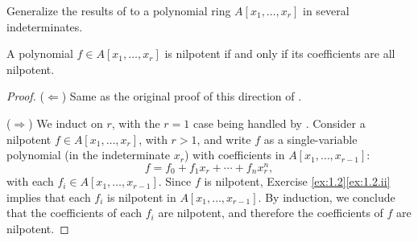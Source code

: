 \begin{exercise}
Generalize the results of  to a polynomial ring \(A[x_1,\ldots,x_r]\) in several indeterminates.
\end{exercise}

\begin{claim}
\label{claim:1.3.ii}
A polynomial \(f\in A[x_1,\ldots,x_r]\) is nilpotent if and only if its coefficients are all nilpotent.
\end{claim}

\begin{proof}
(\(\Leftarrow\))
Same as the original proof of this direction of .

(\(\Rightarrow\))
We induct on \(r\), with the \(r=1\) case being handled by .
Consider a nilpotent \(f \in A[x_1,\ldots,x_r]\), with \(r > 1\), and write \(f\) as a single-variable polynomial (in the indeterminate \(x_r\)) with coefficients in \(A[x_1,\ldots,x_{r-1}]\):
\begin{equation*}
f = f_0 + f_1 x_r + \cdots + f_n x_r^n,
\end{equation*}
with each \(f_i \in A[x_1,\ldots,x_{r-1}]\).
Since \(f\) is nilpotent, Exercise \ref{ex:1.2}\ref{ex:1.2.ii} implies that each \(f_i\) is nilpotent in \(A[x_1,\ldots,x_{r-1}]\).
By induction, we conclude that the coefficients of each \(f_i\) are nilpotent, and therefore the coefficients of \(f\) are nilpotent.
\end{proof}